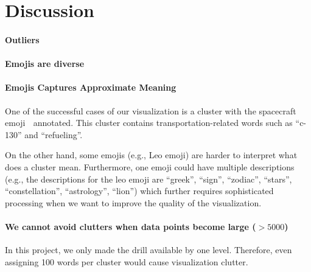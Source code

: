 \section{Discussion}
\label{sec:discussion}

\paragraph{Outliers} 

\paragraph{Emojis are diverse} 

\paragraph{\bf Emojis Captures Approximate Meaning} 
One of the successful cases of our visualization is a cluster with the spacecraft emoji 🚀 annotated. This cluster contains transportation-related words such as ``c-130'' and ``refueling''. 

On the other hand, some emojis (e.g., Leo emoji) are harder to interpret what does a cluster mean. 
Furthermore, one emoji could have multiple descriptions (e.g., the descriptions for the leo emoji are ``greek'', ``sign'', ``zodiac'', ``stars'', ``constellation'', ``astrology'', ``lion'') which further requires sophisticated processing when we want to improve the quality of the visualization. 

\paragraph{\bf We cannot avoid clutters when data points become large ($>5000$)} 
In this project, we only made the drill available by one level. 
Therefore, even assigning 100 words per cluster would cause visualization clutter. 
